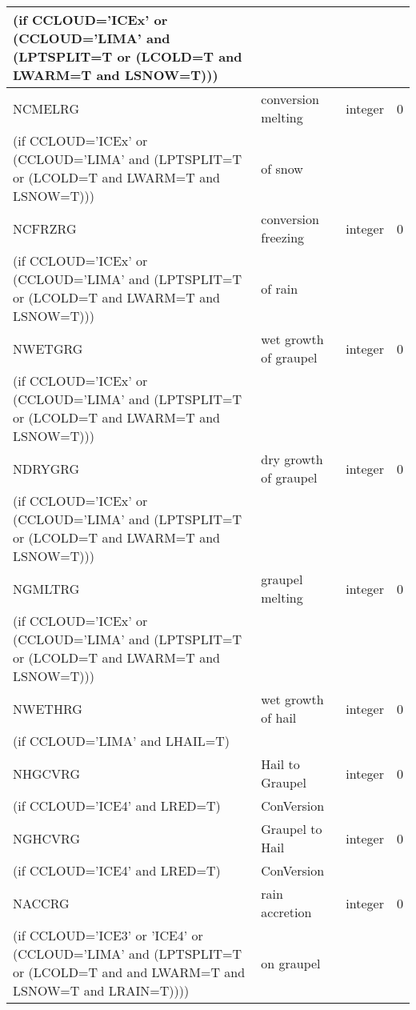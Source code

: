 \begin{longtable} {|p{}|p{}|>{\centering}p{}|p{}<{\centering}|}
(if CCLOUD='ICEx' or (CCLOUD='LIMA' and (LPTSPLIT=T or (LCOLD=T and LWARM=T and LSNOW=T))) & & & \\\hline
NCMELRG  & conversion melting & integer  &  0 \index{NCMELRG!\innam{NAM\_BU\_RRG}}\\ \nopagebreak
(if CCLOUD='ICEx' or (CCLOUD='LIMA' and (LPTSPLIT=T or (LCOLD=T and LWARM=T and LSNOW=T))) & of snow & & \\\hline
NCFRZRG  & conversion freezing & integer  &  0 \index{NCFRZRG!\innam{NAM\_BU\_RRG}}\\ \nopagebreak
(if CCLOUD='ICEx' or (CCLOUD='LIMA' and (LPTSPLIT=T or (LCOLD=T and LWARM=T and LSNOW=T))) & of rain & & \\\hline
NWETGRG  & wet growth of graupel  & integer  &  0 \index{NWETGRG!\innam{NAM\_BU\_RRG}}\\ \nopagebreak
(if CCLOUD='ICEx' or (CCLOUD='LIMA' and (LPTSPLIT=T or (LCOLD=T and LWARM=T and LSNOW=T))) & & & \\\hline
NDRYGRG  & dry growth of graupel  & integer  &  0 \index{NDRYGRG!\innam{NAM\_BU\_RRG}}\\ \nopagebreak
(if CCLOUD='ICEx' or (CCLOUD='LIMA' and (LPTSPLIT=T or (LCOLD=T and LWARM=T and LSNOW=T))) & & & \\\hline
NGMLTRG  & graupel melting  & integer  &  0 \index{NGMLTRG!\innam{NAM\_BU\_RRG}}\\ \nopagebreak
(if CCLOUD='ICEx' or (CCLOUD='LIMA' and (LPTSPLIT=T or (LCOLD=T and LWARM=T and LSNOW=T))) & & & \\\hline
NWETHRG  & wet growth of hail & integer  &  0 \index{NWETHRG!\innam{NAM\_BU\_RRG}}\\ \nopagebreak
(if CCLOUD='LIMA' and LHAIL=T) &  &   &  \\\hline
NHGCVRG  & Hail to Graupel  & integer  &  0 \index{NHGCVRG!\innam{NAM\_BU\_RRG}}\\ \nopagebreak
(if CCLOUD='ICE4' and LRED=T) & ConVersion  &   &  \\\hline
NGHCVRG  & Graupel to Hail  & integer  &  0 \index{NGHCVRG!\innam{NAM\_BU\_RRG}}\\ \nopagebreak
(if CCLOUD='ICE4' and LRED=T) & ConVersion  &   &  \\\hline
NACCRG  & rain accretion & integer  &  0 \index{NACCRG!\innam{NAM\_BU\_RRG}}\\ \nopagebreak
(if CCLOUD='ICE3' or 'ICE4' or (CCLOUD='LIMA' and (LPTSPLIT=T or (LCOLD=T and and LWARM=T and LSNOW=T and LRAIN=T)))) & on graupel &   &  \\\hline

\end{longtable}
